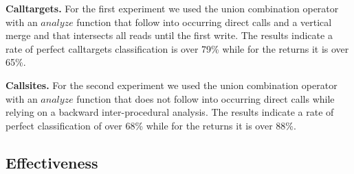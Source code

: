 \textbf{Calltargets.} 
For the first experiment we used the union combination operator with an $analyze$ function that follow into occurring direct calls 
and a vertical merge and that intersects all reads until the first write.
The results indicate a rate of perfect calltargets classification is over 79\% while for the returns it is over 65\%.

\textbf{Callsites.} 
For the second experiment we used the union combination operator with an $analyze$ function that does not follow into occurring direct calls while relying on a backward inter-procedural analysis.
The results indicate a rate of perfect classification of over 68\% while for the returns it is over 88\%.

\subsection{Effectiveness}
\label{section:typeshieldeffectiveness}

